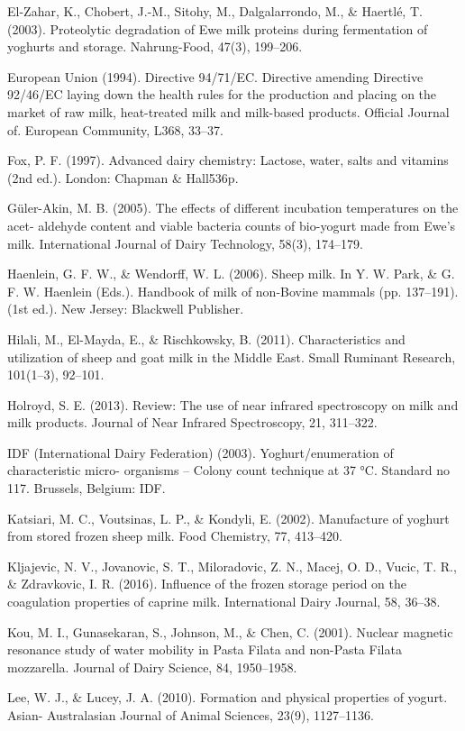 \documentclass[twocolumn]{ctexart}
\begin{document}
El-Zahar, K., Chobert, J.-M., Sitohy, M., Dalgalarrondo, M., \& Haertlé, T. (2003).
Proteolytic degradation of Ewe milk proteins during fermentation of yoghurts and storage. Nahrung-Food, 47(3), 199–206.

European Union (1994). Directive 94/71/EC. Directive amending Directive 92/46/EC
laying down the health rules for the production and placing on the market of raw
milk, heat-treated milk and milk-based products. Official Journal of. European
Community, L368, 33–37.

Fox, P. F. (1997). Advanced dairy chemistry: Lactose, water, salts and vitamins (2nd ed.).
London: Chapman \& Hall536p.

Güler-Akin, M. B. (2005). The effects of different incubation temperatures on the acet-
aldehyde content and viable bacteria counts of bio-yogurt made from Ewe's milk.
International Journal of Dairy Technology, 58(3), 174–179.

Haenlein, G. F. W., \& Wendorff, W. L. (2006). Sheep milk. In Y. W. Park, \& G. F. W.
Haenlein (Eds.). Handbook of milk of non-Bovine mammals (pp. 137–191). (1st ed.).
New Jersey: Blackwell Publisher.

Hilali, M., El-Mayda, E., \& Rischkowsky, B. (2011). Characteristics and utilization of
sheep and goat milk in the Middle East. Small Ruminant Research, 101(1–3), 92–101.

Holroyd, S. E. (2013). Review: The use of near infrared spectroscopy on milk and milk
products. Journal of Near Infrared Spectroscopy, 21, 311–322.

IDF (International Dairy Federation) (2003). Yoghurt/enumeration of characteristic micro-
organisms – Colony count technique at 37 °C. Standard no 117. Brussels, Belgium: IDF.

Katsiari, M. C., Voutsinas, L. P., \& Kondyli, E. (2002). Manufacture of yoghurt from stored
frozen sheep milk. Food Chemistry, 77, 413–420.

Kljajevic, N. V., Jovanovic, S. T., Miloradovic, Z. N., Macej, O. D., Vucic, T. R., \&
Zdravkovic, I. R. (2016). Influence of the frozen storage period on the coagulation
properties of caprine milk. International Dairy Journal, 58, 36–38.

Kou, M. I., Gunasekaran, S., Johnson, M., \& Chen, C. (2001). Nuclear magnetic resonance
study of water mobility in Pasta Filata and non-Pasta Filata mozzarella. Journal of
Dairy Science, 84, 1950–1958.

Lee, W. J., \& Lucey, J. A. (2010). Formation and physical properties of yogurt. Asian-
Australasian Journal of Animal Sciences, 23(9), 1127–1136.
\end{document}
